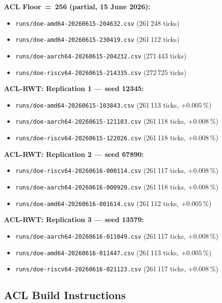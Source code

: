 \documentclass[10pt,a4paper]{article}
\begin{document}
\noindent\textbf{ACL Floor~=~256 (partial, 15 June 2026):}
\begin{itemize}[noitemsep]
  \item \texttt{runs/doe-amd64-20260615-204632.csv}   \quad (261\,248 ticks)
  \item \texttt{runs/doe-amd64-20260615-230419.csv}   \quad (261\,112 ticks)
  \item \texttt{runs/doe-aarch64-20260615-204232.csv} \quad (271\,443 ticks)
  \item \texttt{runs/doe-riscv64-20260615-214335.csv} \quad (272\,725 ticks)
\end{itemize}

\noindent\textbf{ACL-RWT: Replication 1 --- seed 12345:}
\begin{itemize}[noitemsep]
  \item \texttt{runs/doe-amd64-20260615-103843.csv}   \quad (261\,113 ticks, $+0.005\,\%$)
  \item \texttt{runs/doe-aarch64-20260615-121103.csv} \quad (261\,118 ticks, $+0.008\,\%$)
  \item \texttt{runs/doe-riscv64-20260615-122026.csv} \quad (261\,118 ticks, $+0.008\,\%$)
\end{itemize}

\noindent\textbf{ACL-RWT: Replication 2 --- seed 67890:}
\begin{itemize}[noitemsep]
  \item \texttt{runs/doe-riscv64-20260616-000114.csv} \quad (261\,117 ticks, $+0.008\,\%$)
  \item \texttt{runs/doe-aarch64-20260616-000920.csv} \quad (261\,118 ticks, $+0.008\,\%$)
  \item \texttt{runs/doe-amd64-20260616-001614.csv}   \quad (261\,112 ticks, $+0.005\,\%$)
\end{itemize}

\noindent\textbf{ACL-RWT: Replication 3 --- seed 13579:}
\begin{itemize}[noitemsep]
  \item \texttt{runs/doe-aarch64-20260616-011049.csv} \quad (261\,117 ticks, $+0.008\,\%$)
  \item \texttt{runs/doe-amd64-20260616-011447.csv}   \quad (261\,113 ticks, $+0.005\,\%$)
  \item \texttt{runs/doe-riscv64-20260616-021123.csv} \quad (261\,117 ticks, $+0.008\,\%$)
\end{itemize}

\subsection{ACL Build Instructions}
\label{app:acl_build}
\end{document}
